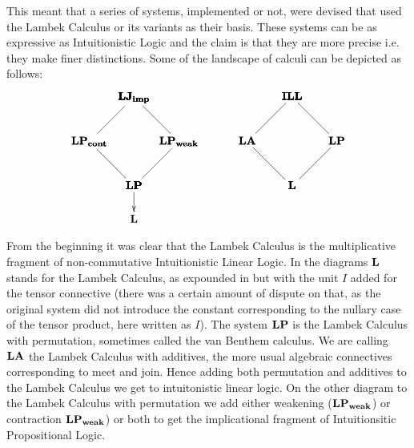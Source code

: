\documentclass{entcs}
\begin{document}

This meant that a series of systems, implemented or not, were devised
that used the Lambek Calculus or its variants as their basis. These
systems can be as expressive as Intuitionistic Logic and the claim is
that they are more precise i.e. they make finer distinctions. Some of
the landscape of calculi can be depicted as follows:
\[  
\begin{array}{cccc}
  \bfig
  \Ctriangle/-``-/<400,400>[
    \textbf{LJ}_{\textbf{imp}}`
    \textbf{LP}_{\textbf{cont}}`
    \textbf{LP};``]

  \Dtriangle(400,0)/`-`-/<400,400>[
    \textbf{LJ}_{\textbf{imp}}`
    \textbf{LP}_{\textbf{weak}}`
    \textbf{LP};``]

  \morphism(400,0)<0,-300>[\textbf{LP}`\textbf{L};]
  \efig
  & \quad &
  \bfig
  \Ctriangle/-``-/<400,400>[
    \textbf{ILL}`
    \textbf{LA}`
    \textbf{L};``]

  \Dtriangle(400,0)/`-`-/<400,400>[
    \textbf{ILL}`
    \textbf{LP}`
    \textbf{L};``]
  \morphism(400,0)//<0,-300>[`;]
  \efig
\end{array}
\]

From the beginning it was clear that the Lambek Calculus is the
multiplicative fragment of non-commutative Intuitionistic Linear
Logic. In the diagrams $\bf L$ stands for the Lambek Calculus, as
expounded in \cite{Lambek1958} but with the unit $I$ added for the
tensor connective (there was a certain amount of dispute on that, as
the original system did not introduce the constant corresponding to
the nullary case of the tensor product, here written as $I$). The
system $\bf{LP}$ is the Lambek Calculus with permutation, sometimes
called the van Benthem calculus. We are calling $\bf{LA}$ the Lambek
Calculus with additives, the more usual algebraic connectives
corresponding to meet and join. Hence adding both permutation and
additives to the Lambek Calculus we get to intuitonistic linear
logic. On the other diagram to the Lambek Calculus with permutation we
add either weakening ($\bf{LP_{weak}}$) or contraction
$\bf{LP_{weak}}$) or both to get the implicational fragment of
Intuitionsitic Propositional Logic.
\end{document}
